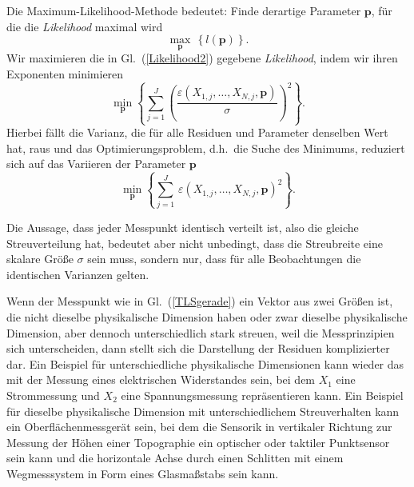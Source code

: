 Die Maximum-Likelihood-Methode bedeutet: Finde derartige Parameter $\mathbf{p}$, für die
die \textsl{Likelihood} maximal wird
\begin{equation}
\max_{\mathbf{p}} \, \left\{ l(\mathbf{p}) \right\}.
\end{equation}
Wir maximieren die in Gl.~(\ref{Likelihood2}) gegebene \textsl{Likelihood}, indem wir
ihren Exponenten minimieren
\begin{equation}
\min_{\mathbf{p}}\left\{ \sum\limits_{j = 1}^J \left(\frac{\varepsilon(X_{1,j},\dots,X_{N,j},\mathbf{p})}{\sigma}\right)^2  \right\}.
\end{equation}
Hierbei fällt die Varianz, die für alle Residuen und Parameter denselben Wert hat, raus und
das Optimierungsproblem, d.h.\ die Suche des Minimums, reduziert sich
auf das Variieren der Parameter $\mathbf{p}$
\begin{equation}
\min_{\mathbf{p}} \left\{ \sum\limits_{j = 1}^J \, \varepsilon(X_{1,j},\dots,X_{N,j},\mathbf{p})^2  \right\} .
\end{equation}

Die Aussage, dass jeder Messpunkt identisch verteilt ist, also die gleiche Streuverteilung hat,
bedeutet aber nicht unbedingt, dass die Streubreite eine skalare Größe $\sigma$ sein muss,
sondern nur, dass für alle Beobachtungen die identischen Varianzen gelten.

Wenn der Messpunkt wie in Gl.~(\ref{TLSgerade}) ein Vektor aus zwei Größen ist, die nicht
dieselbe physikalische Dimension haben oder zwar dieselbe physikalische Dimension, aber dennoch
unterschiedlich stark streuen, weil die Messprinzipien sich unterscheiden, dann stellt sich
die Darstellung der Residuen komplizierter dar. Ein Beispiel für unterschiedliche physikalische
Dimensionen kann wieder das mit der Messung eines elektrischen Widerstandes sein, bei dem $X_1$ eine
Strommessung und $X_2$ eine Spannungsmessung repräsentieren kann.
Ein Beispiel für dieselbe physikalische Dimension mit unterschiedlichem Streuverhalten kann ein
Oberflächenmessgerät sein, bei dem die Sensorik in vertikaler Richtung zur Messung der Höhen einer
Topographie ein optischer oder taktiler Punktsensor sein kann und die horizontale Achse durch einen
Schlitten mit einem Wegmesssystem in Form eines Glasmaßstabs sein kann.


